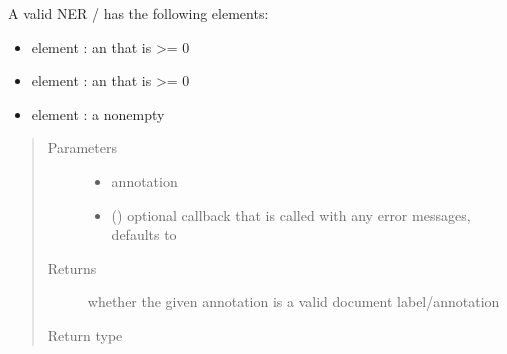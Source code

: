 \documentclass[letterpaper,10pt,english]{sphinxmanual}
\begin{document}
\begin{fulllineitems}
\sphinxAtStartPar
A valid NER / has the following elements:
\begin{itemize}
\item {} 
\sphinxAtStartPar
element : an  that is \textgreater{}= 0

\item {} 
\sphinxAtStartPar
element : an  that is \textgreater{}= 0

\item {} 
\sphinxAtStartPar
element : a non\sphinxhyphen{}empty 

\end{itemize}
\begin{quote}\begin{description}
\item[{Parameters}] \leavevmode\begin{itemize}
\item {} 
\sphinxAtStartPar
{} \textendash{} annotation

\item {} 
\sphinxAtStartPar
{} (\sphinxstyleliteralemphasis{\sphinxupquote{, }}) \textendash{} optional callback that is called with any error messages, defaults to 

\end{itemize}

\item[{Returns}] \leavevmode
\sphinxAtStartPar
whether the given annotation is a valid document label/annotation

\item[{Return type}] \leavevmode
\sphinxAtStartPar
{}

\end{description}\end{quote}

\end{fulllineitems}
\end{document}
